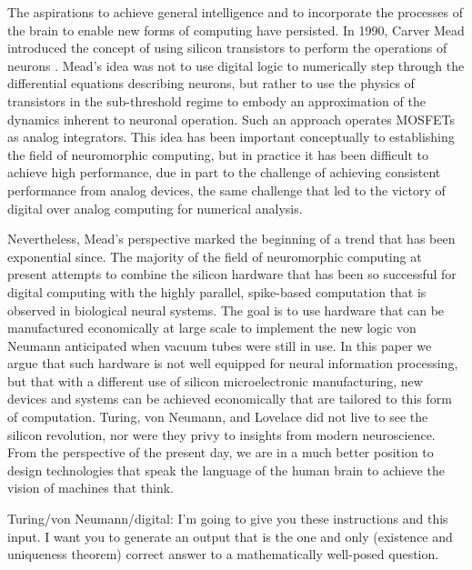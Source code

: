 The aspirations to achieve general intelligence and to incorporate the processes of the brain to enable new forms of computing have persisted. In 1990, Carver Mead introduced the concept of using silicon transistors to perform the operations of neurons \cite{me1990}. Mead's idea was not to use digital logic to numerically step through the differential equations describing neurons, but rather to use the physics of transistors in the sub-threshold regime to embody an approximation of the dynamics inherent to neuronal operation. Such an approach operates MOSFETs as analog integrators. This idea has been important conceptually to establishing the field of neuromorphic computing, but in practice it has been difficult to achieve high performance, due in part to the challenge of achieving consistent performance from analog devices, the same challenge that led to the victory of digital over analog computing for numerical analysis. 

Nevertheless, Mead's perspective marked the beginning of a trend that has been exponential since. The majority of the field of neuromorphic computing at present attempts to combine the silicon hardware that has been so successful for digital computing with the highly parallel, spike-based computation that is observed in biological neural systems. The goal is to use hardware that can be manufactured economically at large scale to implement the new logic von Neumann anticipated when vacuum tubes were still in use. In this paper we argue that such hardware is not well equipped for neural information processing, but that with a different use of silicon microelectronic manufacturing, new devices and systems can be achieved economically that are tailored to this form of computation. Turing, von Neumann, and Lovelace did not live to see the silicon revolution, nor were they privy to insights from modern neuroscience. From the perspective of the present day, we are in a much better position to design technologies that speak the language of the human brain to achieve the vision of machines that think.

 
\vspace{4em}
Turing/von Neumann/digital: I'm going to give you these instructions and this input. I want you to generate an output that is the one and only (existence and uniqueness theorem) correct answer to a mathematically well-posed question.

